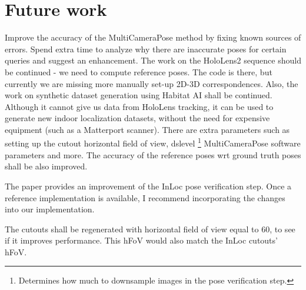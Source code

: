 \documentclass[twoside]{ctuthesis}
\theoremstyle{plain}
\theoremstyle{definition}
\theoremstyle{note}
\begin{document}
\section{Future work}
Improve the accuracy of the MultiCameraPose method by fixing known sources of errors. Spend extra time to analyze why there are inaccurate poses for certain queries and suggest an enhancement. The work on the HoloLens2 sequence should be continued - we need to compute reference poses. The code is there, but currently we are missing more manually set-up 2D-3D correspondences. Also, the work on synthetic dataset generation using Habitat AI shall be continued. Although it cannot give us data from HoloLens tracking, it can be used to generate new indoor localization datasets, without the need for expensive equipment (such as a Matterport scanner). There are extra parameters such as setting up the cutout horizontal field of view, dslevel \footnote{Determines how much to downsample images in the pose verification step.} MultiCameraPose software \cite{MultiCameraPose} parameters and more. The accuracy of the reference poses wrt ground truth poses shall be also improved.

The paper \cite{IsThisTheRightPlace} provides an improvement of the InLoc pose verification step. Once a reference implementation is available, I recommend incorporating the changes into our implementation.

The cutouts shall be regenerated with horizontal field of view equal to 60\degree, to see if it improves performance. This hFoV would also match the InLoc cutouts' hFoV.

\appendix

\printindex

\appendix

%


\end{document}
